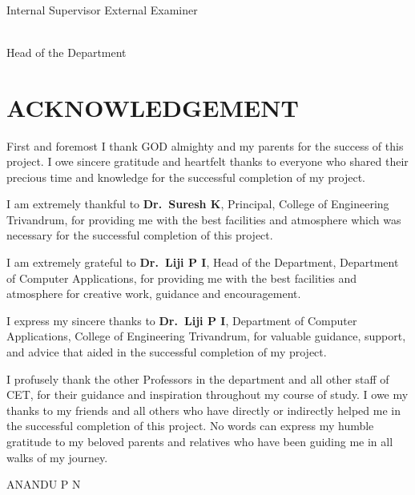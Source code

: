 \documentclass[12pt,a4paper,oneside]{report}
\newcommand{\StudentName}{ANANDU P N}
\newcommand{\GuideName}{Dr.~Liji P I}
\newcommand{\HODName}{Dr.~Liji P I}
\newcommand{\PrincipalName}{Dr.~Suresh K}
\newcommand{\DeptName}{Department of Computer Applications}
\newcommand{\CollegeName}{College of Engineering Trivandrum}
\begin{document}
\vspace{3cm}
\noindent\underline{\hspace{5.5cm}} \hfill \underline{\hspace{5.5cm}}\\[4pt]
\noindent Internal Supervisor \hfill External Examiner

\vspace{3cm}
\noindent\underline{\hspace{5.5cm}}\\[4pt]
\noindent Head of the Department

\newpage
\chapter*{ACKNOWLEDGEMENT}
\noindent First and foremost I thank GOD almighty and my parents for the
success of this project. I owe sincere gratitude and heartfelt thanks to
everyone who shared their precious time and knowledge for the successful
completion of my project.

\noindent I am extremely thankful to \textbf{\PrincipalName}, Principal,
\CollegeName, for providing me with the best facilities and atmosphere
which was necessary for the successful completion of this project.

\noindent I am extremely grateful to \textbf{\HODName}, Head of the Department,
\DeptName, for providing me with the best facilities and atmosphere for
creative work, guidance and encouragement.

\noindent I express my sincere thanks to \textbf{\GuideName},
\DeptName, \CollegeName, for valuable guidance, support, and advice that
aided in the successful completion of my project.

\noindent I profusely thank the other Professors in the
department and all other staff of CET, for their guidance and inspiration
throughout my course of study. I owe my thanks to my friends and all
others who have directly or indirectly helped me in the successful
completion of this project. No words can express my humble gratitude to
my beloved parents and relatives who have been guiding me in all walks of
my journey.

\vspace{1.5cm}
\begin{flushright}
\StudentName
\end{flushright}

\newpage
\tableofcontents
\end{document}
